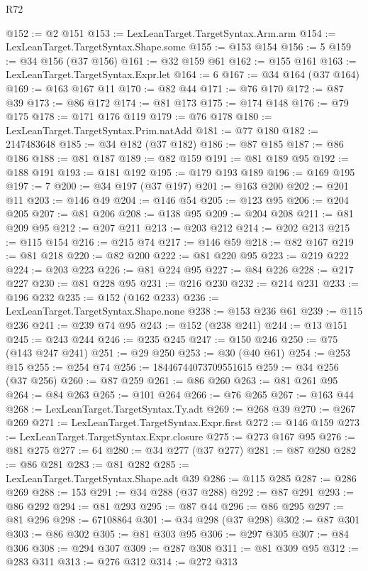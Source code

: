 \begin{lexlean}{R72}
\begin{coremodule}
@152 := @2 @151
@153 := LexLeanTarget.TargetSyntax.Arm.arm
@154 := LexLeanTarget.TargetSyntax.Shape.some
@155 := @153 @154
@156 := 5
@159 := @34 @156 (@37 @156)
@161 := @32 @159 @61
@162 := @155 @161
@163 := LexLeanTarget.TargetSyntax.Expr.let
@164 := 6
@167 := @34 @164 (@37 @164)
@169 := @163 @167 @11
@170 := @82 @44
@171 := @76 @170
@172 := @87 @39
@173 := @86 @172
@174 := @81 @173
@175 := @174 @148
@176 := @79 @175
@178 := @171 @176 @119
@179 := @76 @178
@180 := LexLeanTarget.TargetSyntax.Prim.natAdd
@181 := @77 @180
@182 := 2147483648
@185 := @34 @182 (@37 @182)
@186 := @87 @185
@187 := @86 @186
@188 := @81 @187
@189 := @82 @159
@191 := @81 @189 @95
@192 := @188 @191
@193 := @181 @192
@195 := @179 @193 @189
@196 := @169 @195
@197 := 7
@200 := @34 @197 (@37 @197)
@201 := @163 @200
@202 := @201 @11
@203 := @146 @49
@204 := @146 @54
@205 := @123 @95
@206 := @204 @205
@207 := @81 @206
@208 := @138 @95
@209 := @204 @208
@211 := @81 @209 @95
@212 := @207 @211
@213 := @203 @212
@214 := @202 @213
@215 := @115 @154
@216 := @215 @74
@217 := @146 @59
@218 := @82 @167
@219 := @81 @218
@220 := @82 @200
@222 := @81 @220 @95
@223 := @219 @222
@224 := @203 @223
@226 := @81 @224 @95
@227 := @84 @226
@228 := @217 @227
@230 := @81 @228 @95
@231 := @216 @230
@232 := @214 @231
@233 := @196 @232
@235 := @152 (@162 @233)
@236 := LexLeanTarget.TargetSyntax.Shape.none
@238 := @153 @236 @61
@239 := @115 @236
@241 := @239 @74 @95
@243 := @152 (@238 @241)
@244 := @13 @151
@245 := @243 @244
@246 := @235 @245
@247 := @150 @246
@250 := @75 (@143 @247 @241)
@251 := @29 @250
@253 := @30 (@40 @61)
@254 := @253 @15
@255 := @254 @74
@256 := 18446744073709551615
@259 := @34 @256 (@37 @256)
@260 := @87 @259
@261 := @86 @260
@263 := @81 @261 @95
@264 := @84 @263
@265 := @101 @264
@266 := @76 @265
@267 := @163 @44
@268 := LexLeanTarget.TargetSyntax.Ty.adt
@269 := @268 @39
@270 := @267 @269
@271 := LexLeanTarget.TargetSyntax.Expr.first
@272 := @146 @159
@273 := LexLeanTarget.TargetSyntax.Expr.closure
@275 := @273 @167 @95
@276 := @81 @275
@277 := 64
@280 := @34 @277 (@37 @277)
@281 := @87 @280
@282 := @86 @281
@283 := @81 @282
@285 := LexLeanTarget.TargetSyntax.Shape.adt @39
@286 := @115 @285
@287 := @286 @269
@288 := 153
@291 := @34 @288 (@37 @288)
@292 := @87 @291
@293 := @86 @292
@294 := @81 @293
@295 := @87 @44
@296 := @86 @295
@297 := @81 @296
@298 := 67108864
@301 := @34 @298 (@37 @298)
@302 := @87 @301
@303 := @86 @302
@305 := @81 @303 @95
@306 := @297 @305
@307 := @84 @306
@308 := @294 @307
@309 := @287 @308
@311 := @81 @309 @95
@312 := @283 @311
@313 := @276 @312
@314 := @272 @313

\end{coremodule}
\end{lexlean}
